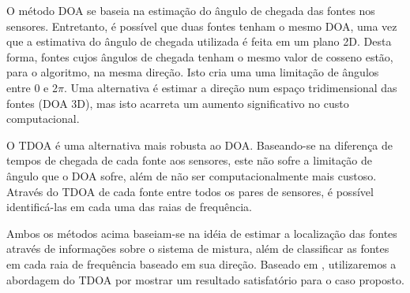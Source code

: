     O método DOA se baseia na estimação do ângulo de chegada das fontes nos sensores. Entretanto, é possível que duas fontes tenham o mesmo DOA, uma vez que a estimativa do ângulo de chegada utilizada é feita em um plano 2D. Desta forma, fontes cujos ângulos de chegada tenham o mesmo valor de cosseno estão, para o algoritmo, na mesma direção. Isto cria uma uma limitação de ângulos entre 0 e 2$\pi$. Uma alternativa é estimar a direção num espaço tridimensional das fontes (DOA 3D), mas isto acarreta um aumento significativo no custo computacional.
    
    O TDOA é uma alternativa mais robusta ao DOA. Baseando-se na diferença de tempos de chegada de cada fonte aos sensores, este não sofre a limitação de ângulo que o DOA sofre, além de não ser computacionalmente mais custoso. Através do TDOA de cada fonte entre todos os pares de sensores, é possível identificá-las em cada uma das raias de frequência.
    
    Ambos os métodos acima baseiam-se na idéia de estimar a localização das fontes através de informações sobre o sistema de mistura, além de classificar as fontes em cada raia de frequência baseado em sua direção. Baseado em \cite{LuizVictorio}, utilizaremos a abordagem do TDOA por mostrar um resultado satisfatório para o caso proposto.